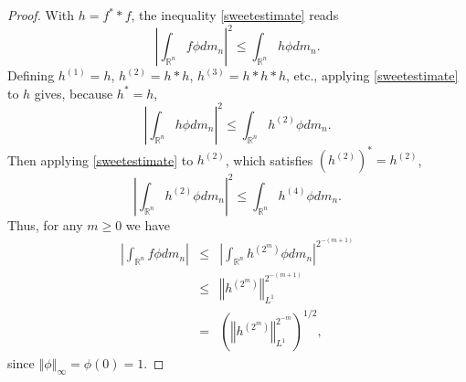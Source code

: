 \documentclass{article}
\newcommand{\norm}[1]{\left\Vert #1 \right\Vert}
\theoremstyle{definition}
\begin{document}
\begin{proof}
With $h=f^* * f$, the inequality \eqref{sweetestimate} reads
\[
\left| \int_{\mathbb{R}^n} f\phi dm_n \right|^2 \leq \int_{\mathbb{R}^n} h\phi dm_n.
\]
Defining $h^{(1)}=h$, $h^{(2)}=h*h$, $h^{(3)}=h*h*h$, etc.,  applying \eqref{sweetestimate} to $h$ gives, because $h^*=h$,
\[
\left| \int_{\mathbb{R}^n} h \phi dm_n \right|^2 \leq \int_{\mathbb{R}^n} h^{(2)} \phi dm_n.
\]
Then applying \eqref{sweetestimate} to $h^{(2)}$, which satisfies $(h^{(2)})^*=h^{(2)}$,
\[
\left| \int_{\mathbb{R}^n} h^{(2)} \phi dm_n \right|^2 \leq \int_{\mathbb{R}^n} h^{(4)} \phi dm_n.
\]
Thus, for any $m \geq 0$ we have 
\begin{eqnarray*}
\left| \int_{\mathbb{R}^n} f \phi dm_n \right| &\leq& \left| \int_{\mathbb{R}^n} h^{\left(2^m\right)} \phi dm_n \right|^{2^{-(m+1)}}\\
&\leq&\norm{h^{\left(2^m\right)}}_{L^1}^{2^{-(m+1)}}\\
&=&\left(\norm{h^{\left(2^m\right)}}_{L^1}^{2^{-m}}\right)^{1/2},
\end{eqnarray*}
since $\norm{\phi}_\infty = \phi(0) =1$. 


\end{proof}
\end{document}

